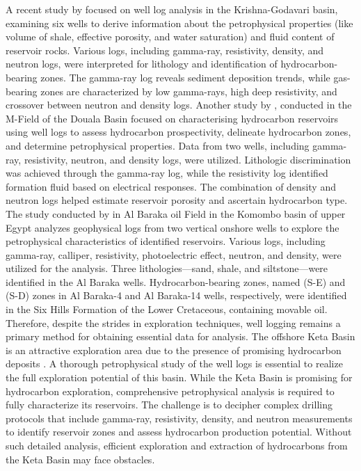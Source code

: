 \documentclass{gji}
\begin{document}
A recent study by \cite{das2018well} focused on well log analysis in the Krishna-Godavari basin, examining six wells to derive information about the petrophysical properties (like volume of shale, effective porosity, and water saturation) and fluid content of reservoir rocks. 
Various logs, including gamma-ray, resistivity, density, and neutron logs, were interpreted for lithology and identification of hydrocarbon-bearing zones.
The gamma-ray log reveals sediment deposition trends, while gas-bearing zones are characterized by low gamma-rays, high deep resistivity, and crossover between neutron and density logs. 
Another study by \cite{chongwain2019petrophysical}, conducted in the M-Field of the Douala Basin focused on characterising hydrocarbon reservoirs using well logs to assess hydrocarbon prospectivity, delineate hydrocarbon zones, and determine petrophysical properties. 
Data from two wells, including gamma-ray, resistivity, neutron, and density logs, were utilized.
Lithologic discrimination was achieved through the gamma-ray log, while the resistivity log identified formation fluid based on electrical responses. 
The combination of density and neutron logs helped estimate reservoir porosity and ascertain hydrocarbon type.
The study conducted by \cite{senosy2020petrophysical} in Al Baraka oil Field in the Komombo basin of upper Egypt analyzes geophysical logs from two vertical onshore wells to explore the petrophysical characteristics of identified reservoirs.
Various logs, including gamma-ray, calliper, resistivity, photoelectric effect, neutron, and density, were utilized for the analysis. 
Three lithologies—sand, shale, and siltstone—were identified in the Al Baraka wells.
Hydrocarbon-bearing zones, named (S-E) and (S-D) zones in Al Baraka-4 and Al Baraka-14 wells, respectively, were identified in the Six Hills Formation of the Lower Cretaceous, containing movable oil. 
Therefore, despite the strides in exploration techniques, well logging remains a primary method for obtaining essential data for analysis.
The offshore Keta Basin is an attractive exploration area due to the presence of promising hydrocarbon deposits \citep{kesse1986oil}.
 A thorough petrophysical study of the well logs is essential to realize the full exploration potential of this basin.
While the Keta Basin is promising for hydrocarbon exploration,  comprehensive petrophysical analysis is required to fully characterize its reservoirs.
 The challenge is to decipher complex drilling protocols that include gamma-ray, resistivity, density, and neutron measurements to identify reservoir zones and assess hydrocarbon production potential.
 Without such detailed analysis, efficient exploration and extraction of hydrocarbons from the Keta Basin may face obstacles.
\end{document}
